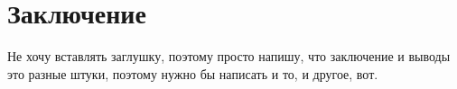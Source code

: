 \chapter*{Заключение}
    Не хочу вставлять заглушку, поэтому просто напишу, что заключение и выводы это разные штуки, поэтому нужно бы написать и то, и другое, вот.